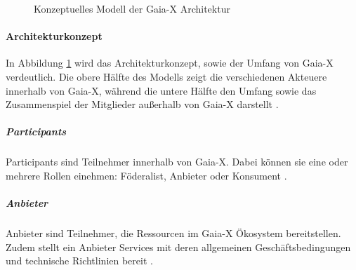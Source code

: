 \begin{figure}[h]
  \centering
  \caption{Konzeptuelles Modell der Gaia-X Architektur}
  \label{fig:gaia-x-concept-architecture}
\end{figure}

\paragraph{Architekturkonzept}
In Abbildung \ref{fig:gaia-x-concept-architecture} wird das Architekturkonzept, sowie der Umfang von Gaia-X verdeutlich.
Die obere Hälfte des Modells zeigt die verschiedenen Akteuere innerhalb von Gaia-X, während die
untere Hälfte den Umfang sowie das Zusammenspiel der Mitglieder außerhalb von Gaia-X darstellt \cite{GaiaXArchitecture2021}.

\subparagraph{Participants}
Participants sind Teilnehmer innerhalb von Gaia-X. 
Dabei können sie eine oder mehrere Rollen einehmen: Föderalist, Anbieter oder Konsument \cite{GaiaXArchitecture2021}.

\subparagraph{Anbieter}
Anbieter sind Teilnehmer, die Ressourcen im Gaia-X Ökosystem bereitstellen. Zudem stellt
ein Anbieter Services mit deren allgemeinen Geschäftsbedingungen und technische Richtlinien bereit \cite{GaiaXArchitecture2021}.

